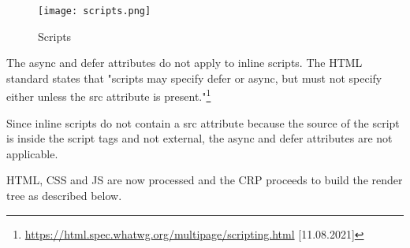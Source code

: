 \begin{figure}[h!]
\begin{center}
\texttt{[image: scripts.png]}
\caption{Scripts}
\label{figure:script_loading}
\end{center}
\end{figure}


The async and defer attributes do not apply to inline scripts.
The HTML standard states that "scripts may specify defer or async, but must not specify either unless the src attribute is present."\footnote{\url{https://html.spec.whatwg.org/multipage/scripting.html} [11.08.2021]}

Since inline scripts do not contain a src attribute because the source of the script is inside the script tags and not external, the async and defer attributes are not applicable.






HTML, CSS and JS are now processed and the CRP proceeds to build the render tree as described below.










